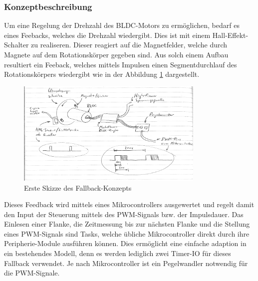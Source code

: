 \subsubsection{Konzeptbeschreibung}
\fi
Um eine Regelung der Drehzahl des BLDC-Motors zu ermöglichen, bedarf es eines
Feebacks, welches die Drehzahl wiedergibt. Dies ist mit einem
Hall-Effekt-Schalter zu realiseren. Dieser reagiert auf die Magnetfelder,
welche durch Magnete auf dem Rotationskörper gegeben sind. Aus solch einem
Aufbau resultiert ein Feeback, welches mittels Impulsen einen Segmentdurchlauf
des Rotationskörpers wiedergibt wie in der Abbildung \ref{fig:fallback-sketch}
dargestellt.
\ifSTANDALONE
\begin{figure}[h!]
	\centering
	\includegraphics[width=0.8\textwidth]{../src/Bilder/fallback_sketch_1.pdf}
	\caption{Erste Skizze des Fallback-Konzepts}
	\label{fig:fallback-sketch}
\end{figure}
\fi
Dieses Feedback wird mittels eines Mikrocontrollers ausgewertet und regelt
damit den Input der Steuerung mittels des PWM-Signals bzw. der Impulsdauer.
Das Einlesen einer Flanke, die Zeitmessung bis zur nächsten Flanke und die
Stellung eines PWM-Signals sind Tasks, welche übliche Mikrocontroller direkt
durch ihre Peripherie-Module ausführen können. Dies ermöglicht eine einfache
adaption in ein bestehendes Modell, denn es werden lediglich zwei Timer-IO
für dieses Fallback verwendet. Je nach Mikrocontroller ist ein Pegelwandler
notwendig für die PWM-Signale.
